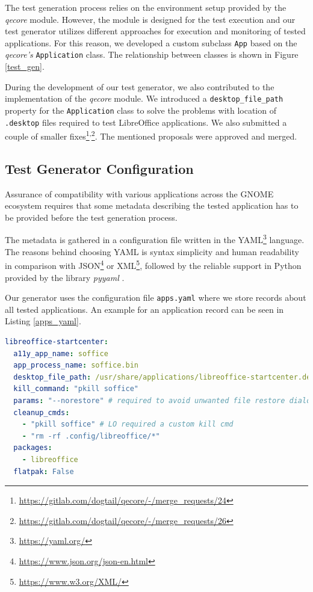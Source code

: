 The test generation process relies on the environment setup provided by the \textit{qecore} module. However, the module is designed for the test execution and our test generator utilizes different approaches for execution and monitoring of tested applications. For this reason, we developed a custom subclass \texttt{App} based on the \textit{qecore's} \texttt{Application} class. The relationship between classes is shown in Figure \ref{test_gen}. 

During the development of our test generator, we also contributed to the implementation of the \textit{qecore} module. We introduced a \texttt{desktop\_file\_path} property for the \texttt{Application} class to solve the problems with location of \texttt{.desktop} files required to test LibreOffice applications. We also submitted a couple of smaller
fixes\footnote{\url{https://gitlab.com/dogtail/qecore/-/merge_requests/24}}\textsuperscript{,}\footnote{\url{https://gitlab.com/dogtail/qecore/-/merge_requests/26}}. The mentioned proposals were approved and merged.


\subsection{Test Generator Configuration}\label{env_config}

Assurance of compatibility with various applications across the GNOME ecosystem requires that some metadata describing the tested application has to be provided before the test generation process. 

The metadata is gathered in a configuration file written in the YAML\footnote{\url{https://yaml.org/}} language. The reasons behind choosing YAML is syntax simplicity and human readability in comparison with JSON\footnote{\url{https://www.json.org/json-en.html}} or XML\footnote{\url{https://www.w3.org/XML/}}, followed by the reliable support in Python provided by the library \textit{pyyaml} \cite{yaml}.

Our generator uses the configuration file \texttt{apps.yaml} where we store records about all tested applications. An example for an application record can be seen in Listing \ref{apps_yaml}. 

\begin{lstlisting}[language=yaml,caption={
An example of the apps.yaml entry for LibreOffice StartCenter},label={apps_yaml}]
libreoffice-startcenter:
  a11y_app_name: soffice
  app_process_name: soffice.bin
  desktop_file_path: /usr/share/applications/libreoffice-startcenter.desktop
  kill_command: "pkill soffice"
  params: "--norestore" # required to avoid unwanted file restore dialogs
  cleanup_cmds:
    - "pkill soffice" # LO required a custom kill cmd
    - "rm -rf .config/libreoffice/*"
  packages:
    - libreoffice
  flatpak: False
\end{lstlisting}

